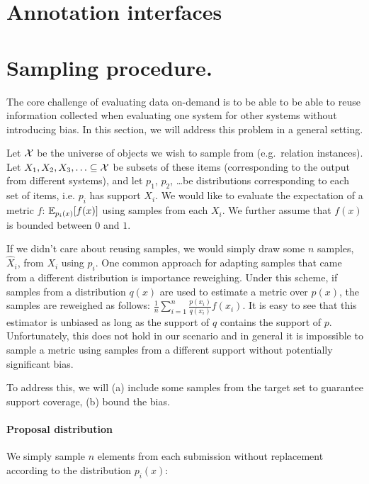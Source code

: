 \onecolumn
\section{Annotation interfaces}
\label{sec:interface}

\section{Sampling procedure.}
\label{sec:sampling}

\newcommand{\Xh}{{\hat{X}}}

The core challenge of evaluating data on-demand is to be able to be able to reuse information collected when evaluating one system for other systems without introducing bias.
In this section, we will address this problem in a general setting.

Let $\mathcal{X}$ be the universe of objects we wish to sample from (e.g.\ relation instances).
Let $X_1, X_2, X_3, \ldots \subseteq \mathcal{X}$ be subsets of these items (corresponding to the output from different systems),
and let $p_1$, $p_2$, \ldots be distributions corresponding to each set of items, i.e. $p_i$ has support $X_i$.
We would like to evaluate the expectation of a metric $f$: $\mathbb{E}_{p_i(x)}[f(x)]$ using samples from each $X_i$. We further assume that $f(x)$ is bounded between $0$ and $1$.

If we didn't care about reusing samples, we would simply draw some $n$ samples, $\Xh_i$, from $X_i$ using $p_i$.
One common approach for adapting samples that came from a different distribution is importance reweighing.
Under this scheme, if samples from a distribution $q(x)$ are used to estimate a metric over $p(x)$, the samples are reweighed as follows: $\frac{1}{n} \sum_{i=1}^n \frac{p(x_i)}{q(x_i)} f(x_i)$.
It is easy to see that this estimator is unbiased as long as the support of $q$ contains the support of $p$.
Unfortunately, this does not hold in our scenario and in general it is impossible to sample a metric using samples from a different support without potentially significant bias.

To address this, we will (a) include some samples from the target set to guarantee support coverage, (b) bound the bias.

\paragraph{Proposal distribution}
We simply sample $n$ elements from each submission without replacement according to the distribution $p_i(x)$:
\begin{algorithm}
\begin{algorithmic}
\ENDFOR{}
\end{algorithmic}
\end{algorithm}

